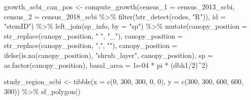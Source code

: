 \documentclass[12pt]{article}
\newenvironment{Shaded}{\begin{snugshade}}{\end{snugshade}}
\newcommand{\AttributeTok}[1]{\textcolor[rgb]{0.77,0.63,0.00}{#1}}
\newcommand{\DecValTok}[1]{\textcolor[rgb]{0.00,0.00,0.81}{#1}}
\newcommand{\FloatTok}[1]{\textcolor[rgb]{0.00,0.00,0.81}{#1}}
\newcommand{\FunctionTok}[1]{\textcolor[rgb]{0.00,0.00,0.00}{#1}}
\newcommand{\NormalTok}[1]{#1}
\newcommand{\OtherTok}[1]{\textcolor[rgb]{0.56,0.35,0.01}{#1}}
\newcommand{\SpecialCharTok}[1]{\textcolor[rgb]{0.00,0.00,0.00}{#1}}
\newcommand{\StringTok}[1]{\textcolor[rgb]{0.31,0.60,0.02}{#1}}
\begin{document}
\begin{Shaded}
\begin{Highlighting}[]
\NormalTok{growth\_scbi\_can\_pos }\OtherTok{\textless{}{-}} \FunctionTok{compute\_growth}\NormalTok{(}\AttributeTok{census\_1 =}\NormalTok{ census\_2013\_scbi, }\AttributeTok{census\_2 =}\NormalTok{ census\_2018\_scbi }\SpecialCharTok{\%\textgreater{}\%}
    \FunctionTok{filter}\NormalTok{(}\SpecialCharTok{!}\FunctionTok{str\_detect}\NormalTok{(codes, }\StringTok{"R"}\NormalTok{)), }\AttributeTok{id =} \StringTok{"stemID"}\NormalTok{) }\SpecialCharTok{\%\textgreater{}\%}
    \FunctionTok{left\_join}\NormalTok{(sp\_info, }\AttributeTok{by =} \StringTok{"sp"}\NormalTok{) }\SpecialCharTok{\%\textgreater{}\%}
    \FunctionTok{mutate}\NormalTok{(}\AttributeTok{canopy\_position =} \FunctionTok{str\_replace}\NormalTok{(canopy\_position, }\StringTok{" "}\NormalTok{, }\StringTok{"\_"}\NormalTok{), }\AttributeTok{canopy\_position =} \FunctionTok{str\_replace}\NormalTok{(canopy\_position,}
        \StringTok{","}\NormalTok{, }\StringTok{""}\NormalTok{), }\AttributeTok{canopy\_position =} \FunctionTok{ifelse}\NormalTok{(}\FunctionTok{is.na}\NormalTok{(canopy\_position), }\StringTok{"shrub\_layer"}\NormalTok{,}
\NormalTok{        canopy\_position), }\AttributeTok{sp =} \FunctionTok{as.factor}\NormalTok{(canopy\_position), }\AttributeTok{basal\_area =} \FloatTok{1e{-}04} \SpecialCharTok{*}
\NormalTok{        pi }\SpecialCharTok{*}\NormalTok{ (dbh1}\SpecialCharTok{/}\DecValTok{2}\NormalTok{)}\SpecialCharTok{\^{}}\DecValTok{2}\NormalTok{)}

\NormalTok{study\_region\_scbi }\OtherTok{\textless{}{-}} \FunctionTok{tibble}\NormalTok{(}\AttributeTok{x =} \FunctionTok{c}\NormalTok{(}\DecValTok{0}\NormalTok{, }\DecValTok{300}\NormalTok{, }\DecValTok{300}\NormalTok{, }\DecValTok{0}\NormalTok{, }\DecValTok{0}\NormalTok{), }\AttributeTok{y =} \FunctionTok{c}\NormalTok{(}\DecValTok{300}\NormalTok{, }\DecValTok{300}\NormalTok{, }\DecValTok{600}\NormalTok{,}
    \DecValTok{600}\NormalTok{, }\DecValTok{300}\NormalTok{)) }\SpecialCharTok{\%\textgreater{}\%}
    \FunctionTok{sf\_polygon}\NormalTok{()}


\end{Highlighting}
\end{Shaded}
\end{document}
